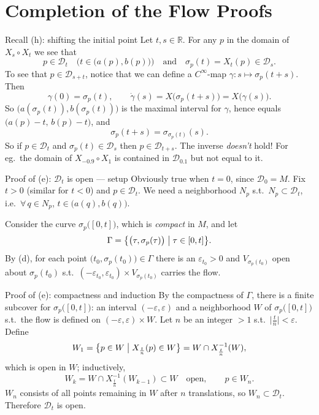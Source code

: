 \documentclass[10pt]{beamer}
\newcommand{\R}{\mathbb{R}}
\newcommand{\D}{\mathcal{D}}
\begin{document}
\section{Completion of the Flow Proofs}

\begin{frame}{Recall (h): shifting the initial point}
	Let $t, s \in \R$. For any $p$ in the domain of $X_s \circ X_t$ we
	see that
	\[
		p \in \D_t
		\quad \bigl( t \in \bigl( a(p), b(p) \bigr) \bigr)
		\quad \text{and} \quad
		\sigma_p(t) = X_t(p) \in \D_s .
	\]
	To see that $p \in \D_{s+t}$, notice that we can define a
	$C^\infty$-map $\gamma : s \longmapsto \sigma_p(t + s)$. Then
	\[
		\gamma(0) = \sigma_p(t), \qquad
		\dot{\gamma}(s) = X\bigl(\sigma_p(t+s)\bigr) = X\bigl(\gamma(s)\bigr).
	\]
	So $\bigl( a(\sigma_p(t)), b(\sigma_p(t)) \bigr)$ is the maximal
	interval for $\gamma$, hence equals $\bigl( a(p) - t,\, b(p) - t
	\bigr)$, and
	\[
		\sigma_p(t + s) = \sigma_{\sigma_p(t)}(s). \tag{2}
	\]
	So if $p \in \D_t$ and $\sigma_p(t) \in \D_s$ then
	$p \in \D_{t+s}$. The inverse \emph{doesn't} hold! For eg.\ the
	domain of $X_{-0.9} \circ X_1$ is contained in $\D_{0.1}$ but not
	equal to it.
\end{frame}

\begin{frame}{Proof of (e): $\D_t$ is open --- setup}
	Obviously true when $t = 0$, since $\D_0 = M$. Fix $t > 0$
	(similar for $t < 0$) and $p \in \D_t$. We need a neighborhood
	$N_p$ s.t.\ $N_p \subset \D_t$, i.e.\ $\forall\, q \in N_p$,
	$t \in \bigl( a(q), b(q) \bigr)$.
	\medskip

	Consider the curve $\sigma_p\bigl( [0, t] \bigr)$, which is
	\emph{compact} in $M$, and let
	\[
		\Gamma = \bigl\{ \bigl( \tau, \sigma_p(\tau) \bigr)
		\bigm| \tau \in [0, t] \bigr\}.
	\]
	By (d), for each point $\bigl( t_0, \sigma_p(t_0) \bigr) \in
	\Gamma$ there is an $\varepsilon_{t_0} > 0$ and
	$V_{\sigma_p(t_0)}$ open about $\sigma_p(t_0)$ s.t.\
	$(-\varepsilon_{t_0}, \varepsilon_{t_0}) \times
	V_{\sigma_p(t_0)}$ carries the flow.
\end{frame}

\begin{frame}{Proof of (e): compactness and induction}
	By the compactness of $\Gamma$, there is a finite subcover for
	$\sigma_p\bigl( [0, t] \bigr)$: an interval $(-\varepsilon,
	\varepsilon)$ and a neighborhood $W$ of $\sigma_p\bigl( [0,t]
	\bigr)$ s.t.\ the flow is defined on $(-\varepsilon, \varepsilon)
	\times W$. Let $n$ be an integer $> 1$ s.t.\ $\bigl| \frac{t}{n}
	\bigr| < \varepsilon$. Define
	\[
		W_1 = \bigl\{ p \in W \bigm| X_{\frac{t}{n}}(p) \in W \bigr\}
		= W \cap X_{\frac{t}{n}}^{-1}(W),
	\]
	which is open in $W$; inductively,
	\[
		W_k = W \cap X_{\frac{t}{n}}^{-1}(W_{k-1}) \subset W
		\quad \text{open}, \qquad p \in W_n .
	\]
	$W_n$ consists of all points remaining in $W$ after $n$
	translations, so $W_n \subset \D_t$. Therefore $\D_t$ is open.
\end{frame}
\end{document}
